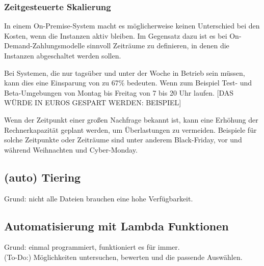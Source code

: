 

\subsubsection{Zeitgesteuerte Skalierung}
In einem On-Premise-System macht es möglicherweise keinen Unterschied bei den Kosten, wenn die Instanzen aktiv bleiben. 
Im Gegensatz dazu ist es bei On-Demand-Zahlungsmodelle sinnvoll Zeiträume zu definieren, in denen die Instanzen abgeschaltet werden sollen.

Bei Systemen, die nur tagsüber und unter der Woche in Betrieb sein müssen, kann dies eine Einsparung von zu 67\% bedeuten.  Wenn zum Beispiel Test- und Beta-Umgebungen von Montag bis Freitag von 7 bis 20 Uhr laufen.
[DAS WÜRDE IN EUROS GESPART WERDEN: BEISPIEL]



Wenn der Zeitpunkt einer großen Nachfrage bekannt ist, kann eine Erhöhung der Rechnerkapazität geplant werden, um Überlastungen zu vermeiden.
Beispiele für solche Zeitpunkte oder Zeiträume sind unter anderem Black-Friday, vor und während Weihnachten und Cyber-Monday.

\subsection{(auto) Tiering }
Grund: nicht alle Dateien brauchen eine hohe Verfügbarkeit.

\subsection{Automatisierung mit Lambda Funktionen}
Grund: einmal programmiert, funktioniert es für immer.
\\(To-Do:) Möglichkeiten untersuchen, bewerten und die passende Auswählen.


